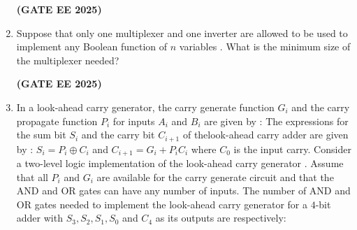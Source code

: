 \documentclass[journal,12pt,onecolumn]{IEEEtran}
\theoremstyle{remark}
\begin{document}
\begin{enumerate}
\begin{enumerate}
        
    \end{enumerate}
    \hfill \textbf{(GATE EE 2025)}
    \item Suppose that only one multiplexer and one inverter are allowed to be used to implement any Boolean function of $n$ variables . What is the minimum size of the multiplexer needed?
    \begin{enumerate}
    \end{enumerate}
    \hfill \textbf{(GATE EE 2025)}
     
    \item In a look-ahead carry generator, the carry generate function $ G_i$ and the carry propagate function $P_i$ for inputs $A_i$ and $B_i$ are given by :
    \newline 
    The expressions for the sum bit $S_i$ and the carry bit $C_{i+1}$ of thelook-ahead carry adder are given by :
    \newline 
    $S_i=P_i \oplus C_i$ and $C_{i+1}= G_i +P_i C_i$ where $C_0$ is the input carry.
    \newline 
    Consider a two-level logic implementation  of the look-ahead carry generator . Assume that all $P_i$ and $G_i$ are available for the carry generate circuit and that the AND and OR gates can have any number of inputs. The number of AND and OR gates  needed to implement the look-ahead carry generator  for a $4$-bit adder with $S_3,S_2,S_1,S_0$ and $C_4$ as its outputs are respectively:
    \begin{enumerate}
\end{enumerate}
\end{enumerate}
\end{document}
